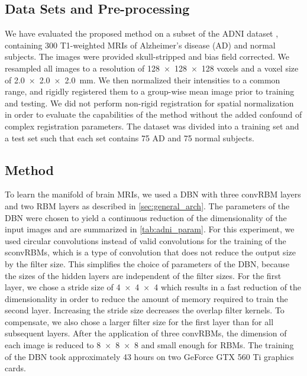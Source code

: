 \subsection[Data sets and pre-processing]{Data Sets and Pre-processing}

We have evaluated the proposed method on a subset of the ADNI dataset
\citep{petersen2010}, containing 300 T1-weighted MRIs of Alzheimer's disease
(AD) and normal subjects. The images were provided skull-stripped and bias field
corrected. We resampled all images to a resolution of \num{128x128x128} voxels
and a voxel size of \SI{2.0x2.0x2.0}{\milli\meter}. We then normalized their
intensities to a common range, and rigidly registered them to a group-wise mean
image prior to training and testing. We did not perform non-rigid registration
for spatial normalization in order to evaluate the capabilities of the method
without the added confound of complex registration parameters. The dataset was
divided into a training set and a test set such that each set contains 75 AD and
75 normal subjects.

\subsection{Method}

To learn the manifold of brain MRIs, we used a DBN with three convRBM layers and
two RBM layers as described in \ref{sec:general_arch}. The parameters of the DBN
were chosen to yield a continuous reduction of the dimensionality of the input
images and are summarized in \ref{tab:adni_param}. For this experiment, we used
circular convolutions instead of valid convolutions for the training of the
sconvRBMs, which is a type of convolution that does not reduce the output size
by the filter size. This simplifies the choice of parameters of the DBN, because
the sizes of the hidden layers are independent of the filter sizes. For the
first layer, we chose a stride size of \num{4x4x4} which results in a fast
reduction of the dimensionality in order to reduce the amount of memory required
to train the second layer. Increasing the stride size decreases the overlap
filter kernels. To compensate, we also chose a larger filter size for the first
layer than for all subsequent layers. After the application of three convRBMs,
the dimension of each image is reduced to \num{8x8x8} and small enough for RBMs.
The training of the DBN took approximately 43 hours on two GeForce GTX 560 Ti
graphics cards.



